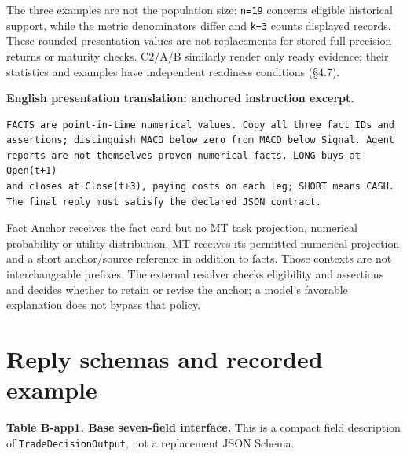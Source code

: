 The three examples are not the population size: \texttt{n=19} concerns eligible
historical support, while the metric denominators differ and \texttt{k=3} counts
displayed records. These rounded presentation values are not replacements
for stored full-precision returns or maturity checks. C2/A/B similarly
render only ready evidence; their statistics and examples have independent
readiness conditions (§4.7).

\textbf{English presentation translation: anchored instruction excerpt.}

\begin{Verbatim}[fontsize=\small,breaklines=true,breakanywhere=true]
FACTS are point-in-time numerical values. Copy all three fact IDs and
assertions; distinguish MACD below zero from MACD below Signal. Agent
reports are not themselves proven numerical facts. LONG buys at Open(t+1)
and closes at Close(t+3), paying costs on each leg; SHORT means CASH.
The final reply must satisfy the declared JSON contract.
\end{Verbatim}

Fact Anchor receives the fact card but no MT task projection, numerical
probability or utility distribution. MT receives its permitted numerical
projection and a short anchor/source reference in addition to facts.
Those contexts are not interchangeable prefixes. The external resolver
checks eligibility and assertions and decides whether to retain or revise
the anchor; a model's favorable explanation does not bypass that policy.

\section{Reply schemas and recorded example}\label{s:c3f8c928db29b641}

\textbf{Table B-app1. Base seven-field interface.} This is a compact field
description of \texttt{TradeDecisionOutput}, not a replacement JSON Schema.

\begingroup
\small
{}
\setlength{\tabcolsep}{3pt}

